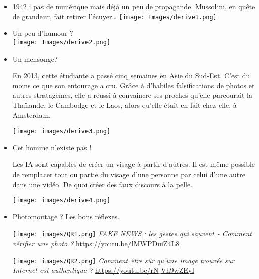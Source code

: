 \documentclass[10pt,fleqn]{article} %
\begin{document}
\begin{itemize}
\item 1942 : pas de numérique mais déjà un peu de propagande. Mussolini, en quête de grandeur, fait retirer l’écuyer…
	\texttt{[image: Images/derive1.png]}
\item Un peu d’humour ?
\\
	\texttt{[image: Images/derive2.png]}
\item Un mensonge?
\begin{multicols}{2}

En 2013, cette étudiante a passé cinq semaines en Asie du Sud-Est. C'est du moins ce que son entourage a cru. Grâce à d'habiles falsifications de photos et autres stratagèmes, elle a réussi à convaincre ses proches qu'elle parcourait la Thaïlande, le Cambodge et le Laos, alors qu'elle était en fait chez elle, à Amsterdam. 

\begin{flushleft}
\texttt{[image: images/derive3.png]}
\end{flushleft}
\end{multicols}
\item Cet homme n’existe pas !

\begin{multicols}{2}

Les IA sont capables de créer un visage à partir d'autres. Il est même possible de remplacer tout ou partie du visage d'une personne par celui d'une autre dans une vidéo. De quoi créer des faux discours à la pelle.

\begin{flushleft}
\texttt{[image: images/derive4.png]}
\end{flushleft}
\end{multicols}

\item Photomontage ? Les bons réflexes.

\begin{multicols}{2}

\texttt{[image: images/QR1.png]}
	\textit{FAKE NEWS : les gestes qui sauvent - Comment vérifier une photo ?}
	\href{https://youtu.be/lMWPDuiZ4L8}{https://youtu.be/lMWPDuiZ4L8}
	
\texttt{[image: images/QR2.png]}
	\textit{Comment être sûr qu’une image trouvée sur Internet est authentique ?}
	\href{https://youtu.be/rN_Vh9wZEyI}{https://youtu.be/rN$\_$Vh9wZEyI}


\end{multicols}
\end{itemize}
\end{document}
